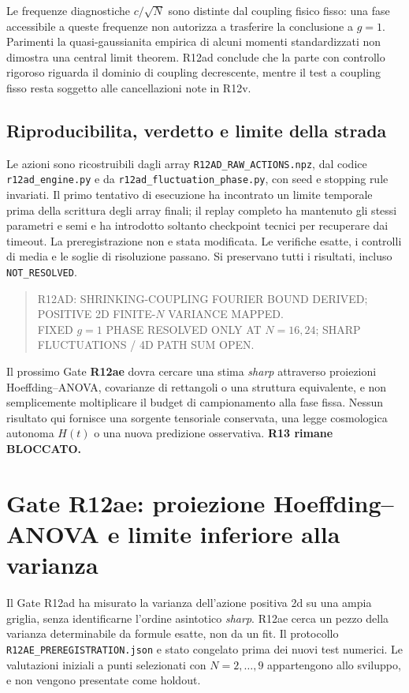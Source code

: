 \documentclass[11pt,a4paper]{article}
\newcommand{\status}[1]{\textsf{#1}}
\begin{document}
Le frequenze diagnostiche $c/\sqrt N$ sono distinte dal coupling fisico fisso: una fase accessibile a queste frequenze non autorizza a trasferire la conclusione a $g=1$. Parimenti la quasi-gaussianita empirica di alcuni momenti standardizzati non dimostra una central limit theorem. R12ad conclude che la parte con controllo rigoroso riguarda il dominio di coupling decrescente, mentre il test a coupling fisso resta soggetto alle cancellazioni note in R12v.

\subsection{Riproducibilita, verdetto e limite della strada}

Le azioni sono ricostruibili dagli array \texttt{R12AD\_RAW\_ACTIONS.npz}, dal codice \texttt{r12ad\_engine.py} e da \texttt{r12ad\_fluctuation\_phase.py}, con seed e stopping rule invariati. Il primo tentativo di esecuzione ha incontrato un limite temporale prima della scrittura degli array finali; il replay completo ha mantenuto gli stessi parametri e semi e ha introdotto soltanto checkpoint tecnici per recuperare dai timeout. La preregistrazione non e stata modificata. Le verifiche esatte, i controlli di media e le soglie di risoluzione passano. Si preservano tutti i risultati, incluso \texttt{NOT\_RESOLVED}.

\begin{quote}
\small
\noindent\status{R12AD: SHRINKING-COUPLING FOURIER BOUND DERIVED; POSITIVE 2D FINITE-$N$ VARIANCE MAPPED.}\\
\status{FIXED $g=1$ PHASE RESOLVED ONLY AT $N=16,24$; SHARP FLUCTUATIONS / 4D PATH SUM OPEN.}
\end{quote}

Il prossimo Gate \textbf{R12ae} dovra cercare una stima \emph{sharp} attraverso proiezioni Hoeffding--ANOVA, covarianze di rettangoli o una struttura equivalente, e non semplicemente moltiplicare il budget di campionamento alla fase fissa. Nessun risultato qui fornisce una sorgente tensoriale conservata, una legge cosmologica autonoma $H(t)$ o una nuova predizione osservativa. \textbf{R13 rimane BLOCCATO.}


\section{Gate R12ae: proiezione Hoeffding--ANOVA e limite inferiore alla varianza}
\label{sec:r12ae}

Il Gate R12ad ha misurato la varianza dell'azione positiva 2d su una ampia griglia, senza identificarne l'ordine asintotico \emph{sharp}. R12ae cerca un pezzo della varianza determinabile da formule esatte, non da un fit. Il protocollo \texttt{R12AE\_PREREGISTRATION.json} e stato congelato prima dei nuovi test numerici. Le valutazioni iniziali a punti selezionati con $N=2,\ldots,9$ appartengono allo sviluppo, e non vengono presentate come holdout.
\end{document}
